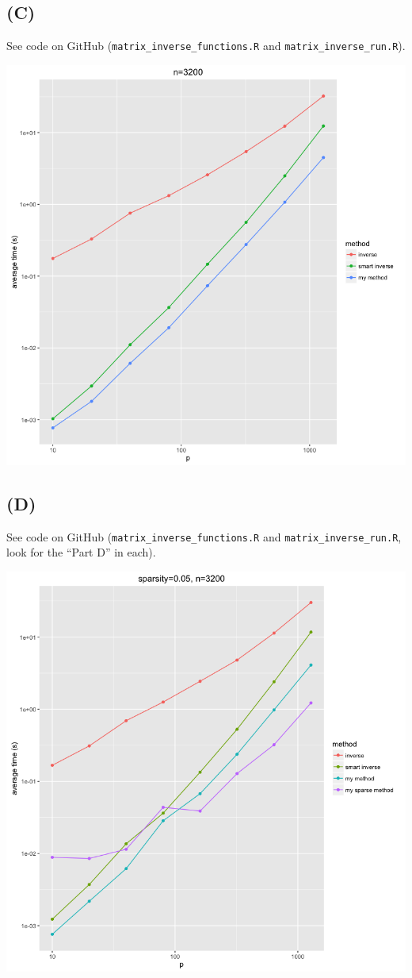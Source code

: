 \documentclass{article}
\begin{document}
\subsection{(C)}
See code on GitHub (\texttt{matrix\_inverse\_functions.R} and \texttt{matrix\_inverse\_run.R}).

\includegraphics[scale=0.5]{log_methods.png}

\subsection{(D)}
See code on GitHub (\texttt{matrix\_inverse\_functions.R} and \texttt{matrix\_inverse\_run.R}, look for the ``Part D'' in each).

\includegraphics[scale=0.5]{sparse.png}
\end{document}
